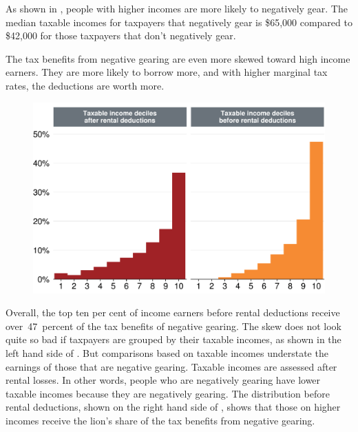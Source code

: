 \documentclass{grattan}\usepackage[]{graphicx}\usepackage[]{color}
\begin{document}
As shown in , people with higher incomes are more likely to negatively gear. The median taxable incomes for taxpayers that negatively gear is \$65,000 compared to  \$42,000 for those taxpayers that don't negatively gear.


The tax benefits from negative gearing are even more skewed toward high income earners. They are more likely to borrow more, and with higher marginal tax rates, the deductions are worth more. 





\begin{figure}
\includegraphics[width=\columnwidth]{CGT-NG-atlas//Benefit-NG-before-after-deductions-1}

\end{figure}

Overall, the top ten per cent of income earners before rental deductions receive over~47~percent 
of the tax benefits of negative gearing. The skew does not look quite so bad if taxpayers are grouped by their taxable incomes, as shown in the left hand side of . But comparisons based on taxable incomes understate the earnings of those that are negative gearing. Taxable incomes are assessed after rental losses. In other words, people who are negatively gearing have lower taxable incomes because they are negatively gearing. The distribution before rental deductions, shown on the right hand side of , shows that those on higher incomes receive the lion's share of the tax benefits from negative gearing.
\end{document}
